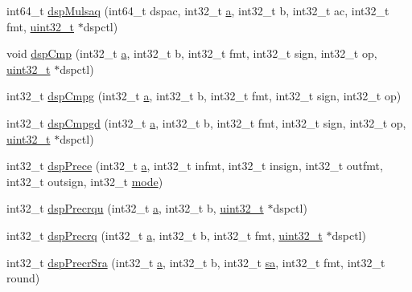 \begin{DoxyCompactItemize}
\item 
int64\_\-t \hyperlink{namespaceMipsISA_a4cc04259ad0dee2a8f51aeafd6f86e92}{dspMulsaq} (int64\_\-t dspac, int32\_\-t \hyperlink{namespaceMipsISA_ad15ace88a723e43c4e98c8c646891e79}{a}, int32\_\-t b, int32\_\-t ac, int32\_\-t fmt, \hyperlink{Type_8hh_a435d1572bf3f880d55459d9805097f62}{uint32\_\-t} $\ast$dspctl)
\item 
void \hyperlink{namespaceMipsISA_abbbcf8d18bd1b22f7507e7485fbdac5a}{dspCmp} (int32\_\-t \hyperlink{namespaceMipsISA_ad15ace88a723e43c4e98c8c646891e79}{a}, int32\_\-t b, int32\_\-t fmt, int32\_\-t sign, int32\_\-t op, \hyperlink{Type_8hh_a435d1572bf3f880d55459d9805097f62}{uint32\_\-t} $\ast$dspctl)
\item 
int32\_\-t \hyperlink{namespaceMipsISA_a295d7a6bdde8c31aff5fa704fd0b076b}{dspCmpg} (int32\_\-t \hyperlink{namespaceMipsISA_ad15ace88a723e43c4e98c8c646891e79}{a}, int32\_\-t b, int32\_\-t fmt, int32\_\-t sign, int32\_\-t op)
\item 
int32\_\-t \hyperlink{namespaceMipsISA_a67fa3d39788e580417830ada4e00b885}{dspCmpgd} (int32\_\-t \hyperlink{namespaceMipsISA_ad15ace88a723e43c4e98c8c646891e79}{a}, int32\_\-t b, int32\_\-t fmt, int32\_\-t sign, int32\_\-t op, \hyperlink{Type_8hh_a435d1572bf3f880d55459d9805097f62}{uint32\_\-t} $\ast$dspctl)
\item 
int32\_\-t \hyperlink{namespaceMipsISA_ac12488f8197cbefee846aecd70428c5c}{dspPrece} (int32\_\-t \hyperlink{namespaceMipsISA_ad15ace88a723e43c4e98c8c646891e79}{a}, int32\_\-t infmt, int32\_\-t insign, int32\_\-t outfmt, int32\_\-t outsign, int32\_\-t \hyperlink{namespaceMipsISA_ae317cde5969f1a58116b73ae0d8adec0}{mode})
\item 
int32\_\-t \hyperlink{namespaceMipsISA_a9f4e496d59bfdc8529c9d569723a1d30}{dspPrecrqu} (int32\_\-t \hyperlink{namespaceMipsISA_ad15ace88a723e43c4e98c8c646891e79}{a}, int32\_\-t b, \hyperlink{Type_8hh_a435d1572bf3f880d55459d9805097f62}{uint32\_\-t} $\ast$dspctl)
\item 
int32\_\-t \hyperlink{namespaceMipsISA_ae9f8befb1c44a3f87e10ef57ff3cd94f}{dspPrecrq} (int32\_\-t \hyperlink{namespaceMipsISA_ad15ace88a723e43c4e98c8c646891e79}{a}, int32\_\-t b, int32\_\-t fmt, \hyperlink{Type_8hh_a435d1572bf3f880d55459d9805097f62}{uint32\_\-t} $\ast$dspctl)
\item 
int32\_\-t \hyperlink{namespaceMipsISA_a5211ce9eb66240a16ac897bca368a8f4}{dspPrecrSra} (int32\_\-t \hyperlink{namespaceMipsISA_ad15ace88a723e43c4e98c8c646891e79}{a}, int32\_\-t b, int32\_\-t \hyperlink{namespaceMipsISA_ac5212d09029b84b4ed4df34dd739329a}{sa}, int32\_\-t fmt, int32\_\-t round)

\end{DoxyCompactItemize}
